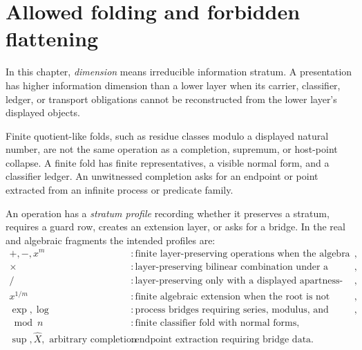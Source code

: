 \section{Allowed folding and forbidden flattening}
\label{sec:information-strata-folding-flattening}

\begin{definition}
\label{def:dimension-as-information-stratum}
In this chapter, \emph{dimension} means irreducible information stratum.  A
presentation has higher information dimension than a lower layer when its
carrier, classifier, ledger, or transport obligations cannot be reconstructed
from the lower layer's displayed objects.
\end{definition}

\begin{principle}
\label{prin:finite-folding-not-infinite-collapse}
Finite quotient-like folds, such as residue classes modulo a displayed
natural number, are not the same operation as a completion, supremum, or
host-point collapse.  A finite fold has finite representatives, a visible
normal form, and a classifier ledger.  An unwitnessed completion asks for an
endpoint or point extracted from an infinite process or predicate family.
\end{principle}

\begin{definition}
\label{def:operation-profile-information-stratum}
An operation has a \emph{stratum profile} recording whether it preserves a
stratum, requires a guard row, creates an extension layer, or asks for a
bridge.  In the real and algebraic fragments the intended profiles are:
$$
\begin{aligned}
+,-,x^m
&:\text{finite layer-preserving operations when the algebra rows exist},\\
\times
&:\text{layer-preserving bilinear combination under a multiplication ledger},\\
/
&:\text{layer-preserving only with a displayed apartness-from-zero guard},\\
x^{1/m}
&:\text{finite algebraic extension when the root is not already carried},\\
\exp,\log
&:\text{process bridges requiring series, modulus, and branch ledgers},\\
\bmod n
&:\text{finite classifier fold with normal forms},\\
\sup,\widehat X,\text{ arbitrary completion}
&:\text{endpoint extraction requiring bridge data}.
\end{aligned}
$$
\end{definition}


